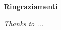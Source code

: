 \thispagestyle{empty}

\begin{center}
  {\bf \Huge Ringraziamenti}
\end{center}

\vspace{4cm}
\emph{Thanks to ...}

